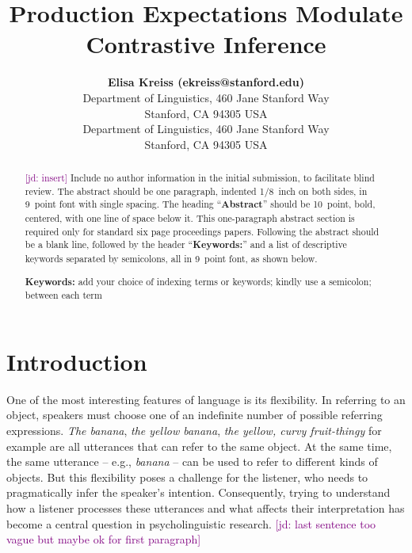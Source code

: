 \documentclass[10pt,letterpaper]{article}
\title{Production Expectations Modulate Contrastive Inference}
\author{{\large \bf Elisa Kreiss (ekreiss@stanford.edu)} \\
  Department of Linguistics, 460 Jane Stanford Way \\
  Stanford, CA 94305 USA
  \AND {\large \bf Judith Degen (jdegen@stanford.edu)} \\
  Department of Linguistics, 460 Jane Stanford Way \\
  Stanford, CA 94305 USA}
\newcommand{\jd}[1]{\textcolor{Purple}{[jd: #1]}}
\begin{document}
\maketitle

\begin{abstract}
\jd{insert}
Include no author information in the initial submission, to facilitate
blind review.  The abstract should be one paragraph, indented 1/8~inch on both sides,
in 9~point font with single spacing. The heading ``{\bf Abstract}''
should be 10~point, bold, centered, with one line of space below
it. This one-paragraph abstract section is required only for standard
six page proceedings papers. Following the abstract should be a blank
line, followed by the header ``{\bf Keywords:}'' and a list of
descriptive keywords separated by semicolons, all in 9~point font, as
shown below.

\textbf{Keywords:} 
add your choice of indexing terms or keywords; kindly use a
semicolon; between each term
\end{abstract}

\section{Introduction}

One of the most interesting features of language is its flexibility. In referring to an object, speakers must choose one of an indefinite number of possible referring expressions. \textit{The banana}, \textit{the yellow banana}, \textit{the yellow, curvy fruit-thingy} for example are all utterances that can refer to the same object. At the same time, the same utterance -- e.g., \emph{banana} -- can be used to refer to different kinds of objects. But this flexibility poses a challenge for the listener, who needs to pragmatically infer the speaker's intention. Consequently, trying to understand how a listener processes these utterances and what affects their interpretation has become a central question in psycholinguistic research. \jd{last sentence too vague but maybe ok for first paragraph}
\end{document}
